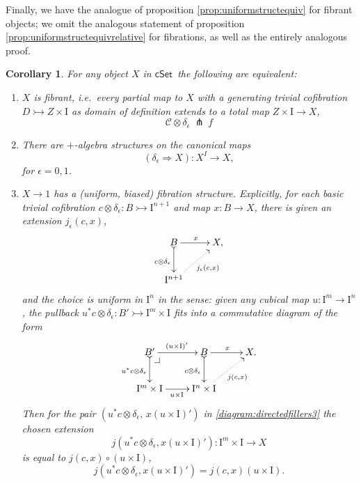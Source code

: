 \documentclass[12pt]{article}
\makeatletter
\newcommand{\cSet}{\ensuremath{\mathsf{cSet}}}
\newcommand{\pbcorner}[1][dr]{\save*!/#1-1.2pc/#1:(-1,1)@^{|-}\restore}
\newcommand{\mono}{\ensuremath{\rightarrowtail}}
\newcommand{\ra}{\ensuremath{\rightarrow}}
\newcommand{\I}{\ensuremath{\mathrm{I}}}
\newtheorem{corollary}[theorem]{Corollary}
\theoremstyle{remark}
\theoremstyle{definition}
\makeatother
\begin{document}
Finally, we have the analogue of proposition \ref{prop:uniformstructequiv} for fibrant objects; we omit the analogous statement of proposition \ref{prop:uniformstructequivrelative} for fibrations, as well as the entirely analogous proof.

\begin{corollary}\label{cor:uniformfibstructequiv}  For any object $X$ in \cSet\ the following are equivalent:
\begin{enumerate}
\item $X$ is \emph{fibrant}, i.e.\ every partial map to $X$ with a generating trivial cofibration $D \mono Z \times \I$ as domain of definition extends to a total map $Z \times \I \ra X$,
$$\mathcal{C}\otimes \delta_\epsilon\ \pitchfork\ f$$

\item There are $+$-algebra structures on the canonical maps $$(\delta_\epsilon\Rightarrow{X}) : X^I \ra X,$$ for $\epsilon = 0,1$.

\item $X\ra 1$ has a \emph{(uniform, biased) fibration structure}.  Explicitly, for each basic trivial cofibration $c \otimes \delta_\epsilon : B \mono \I^{n+1}$ and map $x : B\ra X$, there is given an extension $j_\epsilon(c,x)$,
\begin{equation}\label{diagram:directedfillers}
\xymatrix{
B \ar@{>->}[d]_{c \otimes \delta_\epsilon} \ar[r]^{x} & X, \\
\I^{n+1}\ar@{.>}[ru]_{j_\epsilon(c,x)} &
}
\end{equation}
and the choice is \emph{uniform in $\I^n$} in the sense: given any cubical map $u : \I^m \ra \I^n$, the pullback  $u^*c \otimes \delta_\epsilon : B'\mono \I^{m}\times\I$ fits into a commutative diagram of the form
\begin{equation}\label{diagram:directedfillers3}
\xymatrix{
B' \ar@{>->}[d]_{u^*c \otimes \delta_\epsilon} \ar[r]^{(u\times\I)'} \pbcorner &  B \ar@{>->}[d]_{c \otimes \delta_\epsilon } \ar[r]^{x} & X. \\
\I^{m}\times\I \ar[r]_{u\times\I } & \I^{n}\times\I \ar@{.>}[ru]_{j(c,x)} &
}
\end{equation}
Then for the pair $(u^*c \otimes \delta_\epsilon,\, x(u\times\I)')$ in \eqref{diagram:directedfillers3} the chosen extension $$j(u^*c \otimes \delta_\epsilon,x(u\times\I)'): \I^m\times\I \ra X$$ is equal to  $j(c,x)\circ (u\times\I)$,
\begin{equation}\label{eq:uniformfillers}
j(u^*c \otimes \delta_\epsilon,x(u\times\I)') = j(c,x) (u\times\I).
\end{equation}
\end{enumerate}
\end{corollary}
\end{document}

